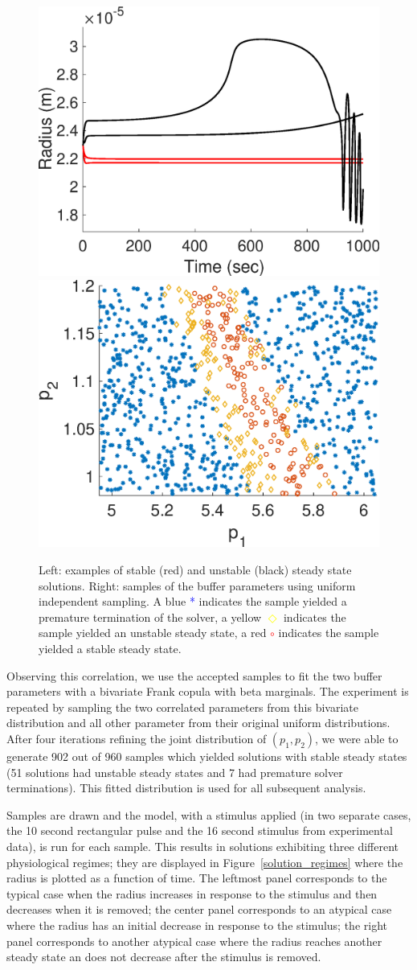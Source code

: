 \begin{figure}[h]
\centering
\includegraphics[width=.4 \textwidth]{Figures/Steady_State_Curves.eps}
\includegraphics[width=.4 \textwidth]{Figures/First_Iteration_Samples.eps}
\caption{Left: examples of stable (red) and unstable (black) steady state solutions. Right: samples of the buffer parameters using uniform independent sampling. A blue \textcolor{blue}{*} indicates the sample yielded a premature termination of the solver, a yellow \textcolor{yellow}{$\Diamond$} indicates the sample yielded an unstable steady state, a red \textcolor{red}{$\circ$} indicates the sample yielded a stable steady state.}
\label{steady_states}
\end{figure}

Observing this correlation, we use the accepted samples to fit the two buffer parameters with a bivariate Frank copula with beta marginals. The experiment is repeated by sampling the two correlated parameters from this bivariate distribution and all other parameter from their original uniform distributions. After four iterations refining the joint distribution of $(p_1,p_2)$, we were able to generate 902 out of 960 samples which yielded solutions with stable steady states (51 solutions had unstable steady states and 7 had premature solver terminations). This fitted distribution is used for all subsequent analysis. 

Samples are drawn and the model, with a stimulus applied (in two separate cases, the 10 second rectangular pulse and the 16 second stimulus from experimental data), is run for each sample. This results in solutions exhibiting three different physiological regimes; they are displayed in Figure~\ref{solution_regimes} where the radius is plotted as a function of time. The leftmost panel corresponds to the typical case when the radius increases in response to the stimulus and then decreases when it is removed; the center panel corresponds to an atypical case where the radius has an initial decrease in response to the stimulus; the right panel corresponds to another atypical case where the radius reaches another steady state an does not decrease after the stimulus is removed.

